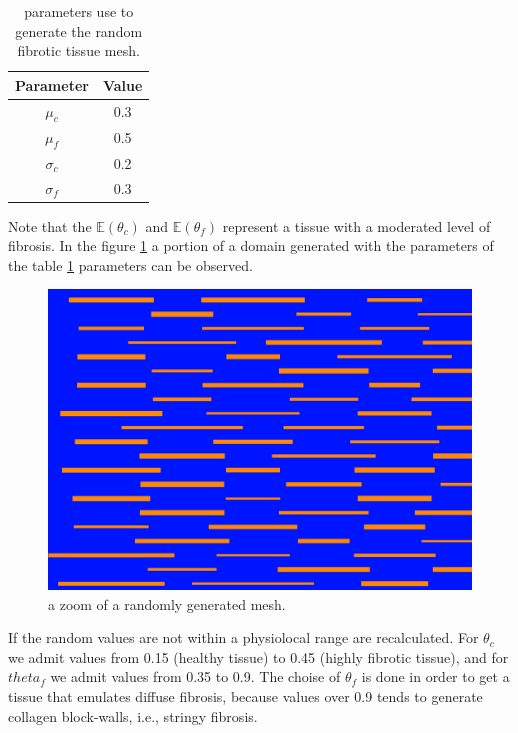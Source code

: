 \documentclass[letterpaper]{article} 			     	%
\begin{document}
\begin{table}[H]
\centering
\caption{ parameters use to generate the random fibrotic tissue mesh.}
\label{tab:ex4_parametros_random}
\begin{tabular}{@{}cc@{}}
\toprule
Parameter  & Value \\ \midrule
$\mu_c$    & 0.3   \\
$\mu_f$    & 0.5   \\
$\sigma_c$ & 0.2   \\
$\sigma_f$ & 0.3   \\ \bottomrule
\end{tabular}
\end{table}

Note that the $\mathbb{E}(\theta_c)$ and $\mathbb{E}(\theta_f)$ represent a tissue with a moderated level of fibrosis. In the figure \ref{fig:ex3_random} a portion of a domain generated with the parameters of the table \ref{tab:ex4_parametros_random} parameters can be observed.

\begin{figure}[H]
\centering
\includegraphics[height = 3.5 cm]{fig/Numerical_Experiments/ex4/random_mesh}
\caption{a zoom of a randomly generated mesh.} \label{fig:ex3_random}
\end{figure}


If the random values are not within a physiolocal range are recalculated. For $\theta_c$ we admit values from 0.15 (healthy tissue) to 0.45 (highly fibrotic tissue), and for $theta_f$ we admit values from 0.35 to 0.9. The choise of $\theta_f$ is done in order to get a tissue that emulates diffuse fibrosis, because values over 0.9 tends to generate collagen block-walls, i.e., stringy fibrosis.
\end{document}
